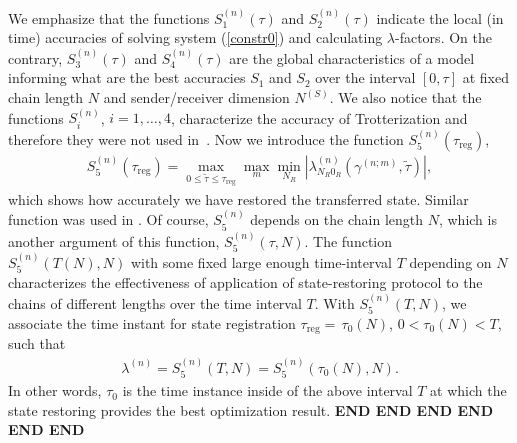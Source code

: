\documentclass[pra,preprint,showpacs]{revtex4-1}
\begin{document}
{{ We emphasize that the functions $S^{(n)}_1(\tau)$ and $S^{(n)}_2(\tau)$ indicate the local (in time) accuracies of solving system (\ref{constr0}) and calculating $\lambda$-factors.
On the contrary, $S^{(n)}_3(\tau)$ and $S^{(n)}_4(\tau)$ are the
global characteristics of  a model informing  what are the best accuracies  $S_1$ and $S_2$ over the interval $[0,\tau]$ at fixed chain length $N$ and sender/receiver dimension $N^{(S)}$.}
{We also} notice that the functions $S^{(n)}_i$, $i=1,\dots,4$, characterize the accuracy of Trotterization  and therefore they were not used in~\cite{BFLP_2022}. Now we introduce the function
$S^{(n)}_5(\tau_{\mathrm{reg}})$,
\begin{eqnarray}\label{S5}
S^{(n)}_5(\tau_{\mathrm{reg}}) = \max_{0\le\tilde \tau\le \tau_{\mathrm{reg}}} \max_{m} \min_{N_R} \left|\lambda ^{(n)}_{N_R0_R} (\gamma^{(n;m)},\tilde \tau)\right|,
\end{eqnarray}
which shows how accurately we have restored the transferred state. Similar function was used in \cite{BFLP_2022}. Of course, $S^{(n)}_5$ depends on the chain length $N$, which is another argument of this  function, $S^{(n)}_5(\tau,N)$. The function $S^{(n)}_5(T(N),N)$ with some fixed large enough time-interval $T$ depending on $N$ characterizes the effectiveness of application of state-restoring protocol to the chains of different lengths over the  time interval $T$.  With $S^{(n)}_5(T,N)$, we associate the time instant { for  state registration}  ${\tau_{\mathrm{reg}} =} \,\tau_0(N)$,
$0<\tau_0(N)< T $, such that
\begin{eqnarray}\label{lamn2}
\lambda^{(n)}=S^{(n)}_5(T,N) = S^{(n)}_5(\tau_0(N) ,N).
\end{eqnarray}
In other words, $\tau_0$ is the time instance inside of the above interval $T$ at which the state restoring provides the best optimization result.
{\bf END   END  END  END  END  END}
\fi

}
\end{document}
